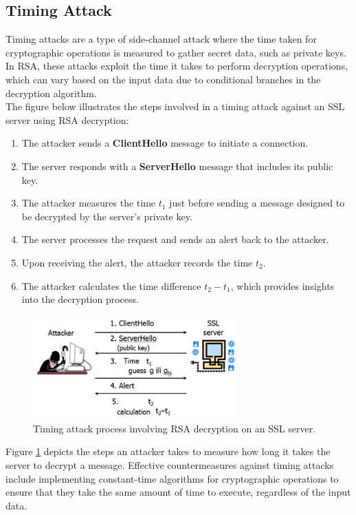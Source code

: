 \documentclass[11pt,a4paper]{article}
\numberwithin{equation}{section}
\begin{document}
\subsection{Timing Attack}
Timing attacks are a type of side-channel attack where the time taken for cryptographic operations is measured to gather secret data, such as private keys. In RSA, these attacks exploit the time it takes to perform decryption operations, which can vary based on the input data due to conditional branches in the decryption algorithm. \\
The figure below illustrates the steps involved in a timing attack against an SSL server using RSA decryption:
\begin{enumerate}
    \item The attacker sends a \textbf{ClientHello} message to initiate a connection.
    \item The server responds with a \textbf{ServerHello} message that includes its public key.
    \item The attacker measures the time $t_1$ just before sending a message designed to be decrypted by the server's private key.
    \item The server processes the request and sends an alert back to the attacker.
    \item Upon receiving the alert, the attacker records the time $t_2$.
    \item The attacker calculates the time difference $t_2 - t_1$, which provides insights into the decryption process.
\end{enumerate}

\begin{figure}[H]
\centering
\includegraphics[width=0.7\textwidth]{timing_attack.png}
\caption{Timing attack process involving RSA decryption on an SSL server. \cite{atk}}
\label{fig:timing_attack}
\end{figure}
\noindent Figure \ref{fig:timing_attack} depicts the steps an attacker takes to measure how long it takes the server to decrypt a message. Effective countermeasures against timing attacks include implementing constant-time algorithms for cryptographic operations to ensure that they take the same amount of time to execute, regardless of the input data.
\end{document}
